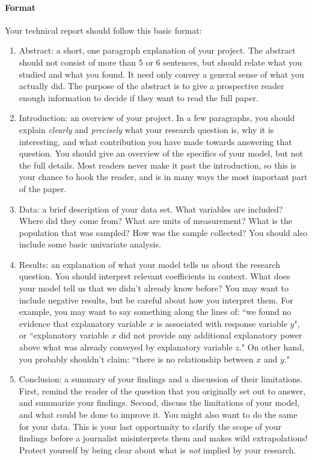 \documentclass[10pt]{article}
\begin{document}
\paragraph{Format}
Your technical report should follow this basic format:
	\begin{enumerate}
		\item Abstract: a short, one paragraph explanation of your project. The abstract should not consist of more than 5 or 6 sentences, but should relate what you studied and what you found. It need only convey a general sense of what you actually did. The purpose of the abstract is to give a prospective reader enough information to decide if they want to read the full paper. 
		\item Introduction: an overview of your project. In a few paragraphs, you should explain \emph{clearly} and \emph{precisely} what your research question is, why it is interesting, and what contribution you have made towards answering that question. You should give an overview of the specifics of your model, but not the full details. Most readers never make it past the introduction, so this is your chance to hook the reader, and is in many ways the most important part of the paper.
		\item Data: a brief description of your data set. What variables are included? Where did they come from? What are units of measurement? What is the population that was sampled? How was the sample collected? You should also include some basic univariate analysis. 
		\item Results: an explanation of what your model tells us about the research question. You should interpret relevant coefficients in context. What does your model tell us that we didn't already know before? You may want to include negative results, but be careful about how you interpret them. For example, you may want to say something along the lines of: ``we found no evidence that explanatory variable $x$ is associated with response variable $y$", or ``explanatory variable $x$ did not provide any additional explanatory power above what was already conveyed by explanatory variable $z$." On other hand, you probably shouldn't claim: ``there is no relationship between $x$ and $y$."
		\item Conclusion: a summary of your findings and a discussion of their limitations. First, remind the reader of the question that you originally set out to answer, and summarize your findings. Second, discuss the limitations of your model, and what could be done to improve it. You might also want to do the same for your data. This is your last opportunity to clarify the scope of your findings before a journalist misinterprets them and makes wild extrapolations! Protect yourself by being clear about what is \emph{not} implied by your research.
\end{enumerate}
\end{document}
